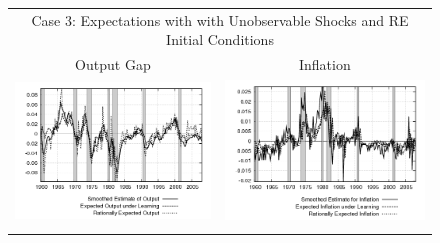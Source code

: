 \begin{figure}
\begin{tabular}{cc}
\multicolumn{2}{c}{Case 3: Expectations with with Unobservable Shocks and RE Initial Conditions} \\ 
Output Gap & Inflation \\
\includegraphics[scale=0.48]{results_reinit/output_exp.png} & 
\includegraphics[scale=0.48]{results_reinit/inflation_exp.png} \\ \\ 
 

\end{tabular}
\end{figure}
